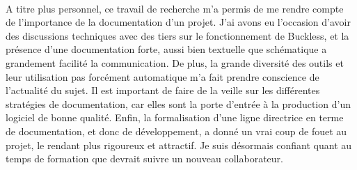 \paragraph{}
    A titre plus personnel, ce travail de recherche m'a permis de me rendre compte de l'importance
    de la documentation d'un projet. J'ai avons eu l'occasion d'avoir des discussions techniques avec
    des tiers sur le fonctionnement de Buckless, et la présence d'une documentation forte,
    aussi bien textuelle que schématique a grandement facilité la communication. De plus, la grande
    diversité des outils et leur utilisation pas forcément automatique m'a fait prendre conscience
    de l'actualité du sujet. Il est important de faire de la veille sur les différentes stratégies de
    documentation, car elles sont la porte d'entrée à la production d'un logiciel de bonne qualité.
    Enfin, la formalisation d'une ligne directrice en terme de documentation, et donc de développement,
    a donné un vrai coup de fouet au projet, le rendant plus rigoureux et attractif. Je suis désormais
    confiant quant au temps de formation que devrait suivre un nouveau collaborateur.